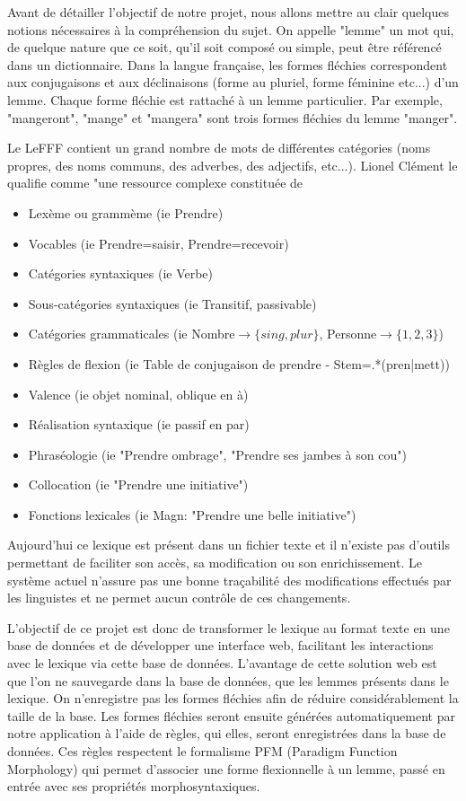 \documentclass[12pt,a4paper]{article}
\begin{document}
    Avant de détailler l’objectif de notre projet, nous allons mettre
    au clair quelques notions nécessaires à la compréhension du sujet.
    On appelle "lemme" un mot qui, de quelque nature que ce soit, qu'il soit composé ou simple, peut être référencé dans un dictionnaire.
    Dans la langue française, les formes fléchies correspondent aux conjugaisons et aux déclinaisons (forme au pluriel, forme féminine etc...) d'un lemme. Chaque forme fléchie est rattaché à un lemme particulier.
    Par exemple, "mangeront", "mange" et "mangera" sont trois formes fléchies du lemme "manger".

    Le LeFFF contient un grand nombre de mots de différentes catégories (noms propres, des noms communs, des adverbes, des adjectifs, etc...).
    Lionel Clément le qualifie comme "une ressource complexe constituée de
    \begin{itemize}
        \item Lexème ou grammème (ie Prendre)
        \item Vocables (ie Prendre=saisir, Prendre=recevoir)
        \item Catégories syntaxiques (ie Verbe)
        \item Sous-catégories syntaxiques (ie Transitif, passivable)
        \item Catégories grammaticales (ie Nombre$\rightarrow\{sing, plur\}$, Personne$\rightarrow\{1, 2, 3\}$)
        \item Règles de flexion (ie Table de conjugaison de prendre - Stem=.*(pren|mett))
        \item Valence (ie objet nominal, oblique en à)
        \item Réalisation syntaxique (ie passif en par)
        \item Phraséologie (ie "Prendre ombrage", "Prendre ses jambes à son cou")
        \item Collocation (ie "Prendre une initiative")
        \item Fonctions lexicales (ie Magn: "Prendre une belle initiative")
    \end{itemize}

    \smallbreak Aujourd'hui ce lexique est présent dans un fichier texte et il n'existe pas d'outils permettant de faciliter son accès, sa modification ou son enrichissement.
    Le système actuel n'assure pas une bonne traçabilité des modifications effectués par les linguistes et ne permet aucun contrôle de ces changements.

    L'objectif de ce projet est donc de transformer le lexique au format texte en une base de données et de développer une interface web, facilitant les interactions avec le lexique via cette base de données.
    L'avantage de cette solution web est que l'on ne sauvegarde dans la base de données, que les lemmes présents dans le lexique. On n'enregistre pas les formes fléchies afin de réduire considérablement la taille de la base.
    Les formes fléchies seront ensuite générées automatiquement par notre application à l'aide de règles, qui elles, seront enregistrées dans la base de données.
    Ces règles respectent le formalisme PFM (Paradigm Function Morphology) qui permet d'associer une forme flexionnelle à un lemme, passé en entrée avec ses propriétés morphosyntaxiques.
\end{document}
